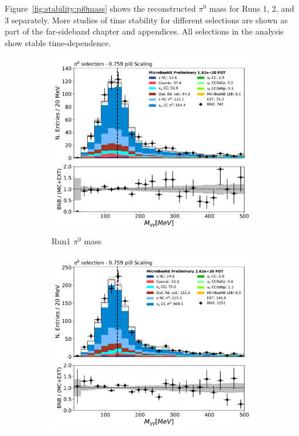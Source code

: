 \documentclass[a4paper]{article}
\begin{document}
Figure~\ref{fig:stability:pi0mass} shows the reconstructed $\pi^0$ mass for Runs 1, 2, and 3 separately. More studies of time stability for different selections are shown as part of the far-sideband chapter and appendices. All selections in the analysis show stable time-dependence. 

\begin{figure}[H] 
\begin{center}
    \begin{subfigure}[b]{0.3\textwidth}
    \centering
    \includegraphics[width=1.00\textwidth]{stability/pi0_mass_Y_corrpi0_mass_Y_corr_run1.pdf}
    \caption{\label{fig:stability:pi0mass:R1} Run1 $\pi^0$ mass}
    \end{subfigure}
    \begin{subfigure}[b]{0.3\textwidth}
    \centering
    \includegraphics[width=1.00\textwidth]{stability/pi0_mass_Y_corrpi0_mass_Y_corr_run2.pdf}

\end{subfigure}
\end{center}
\end{figure}
\end{document}
